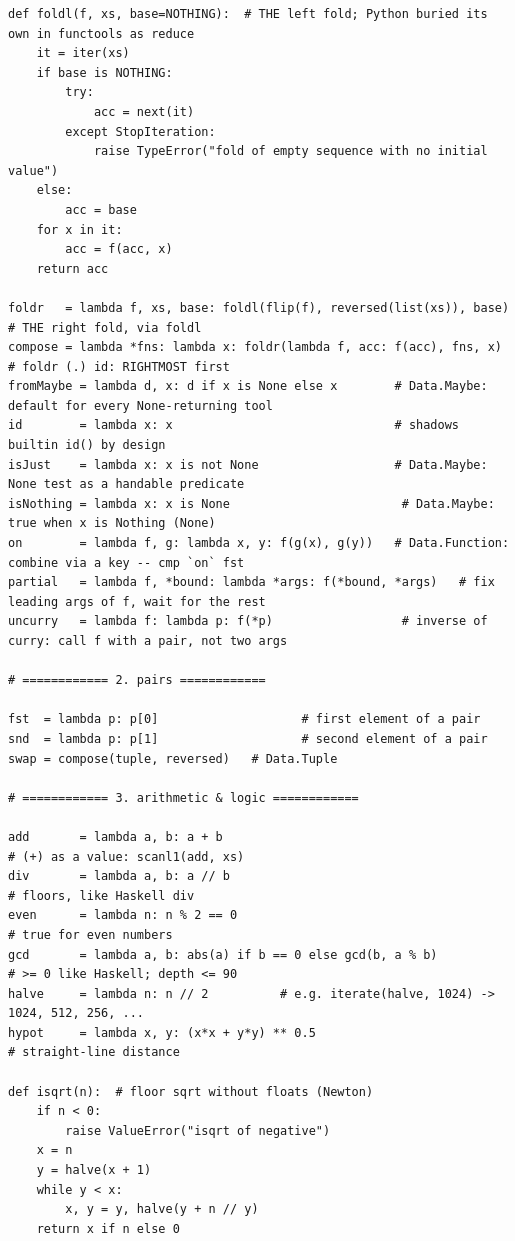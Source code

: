 \documentclass[11pt,letterpaper]{book}
\begin{document}
\begin{lstlisting}[style=file]
def foldl(f, xs, base=NOTHING):  # THE left fold; Python buried its own in functools as reduce
    it = iter(xs)
    if base is NOTHING:
        try:
            acc = next(it)
        except StopIteration:
            raise TypeError("fold of empty sequence with no initial value")
    else:
        acc = base
    for x in it:
        acc = f(acc, x)
    return acc

foldr   = lambda f, xs, base: foldl(flip(f), reversed(list(xs)), base)  # THE right fold, via foldl
compose = lambda *fns: lambda x: foldr(lambda f, acc: f(acc), fns, x)   # foldr (.) id: RIGHTMOST first
fromMaybe = lambda d, x: d if x is None else x        # Data.Maybe: default for every None-returning tool
id        = lambda x: x                               # shadows builtin id() by design
isJust    = lambda x: x is not None                   # Data.Maybe: None test as a handable predicate
isNothing = lambda x: x is None                        # Data.Maybe: true when x is Nothing (None)
on        = lambda f, g: lambda x, y: f(g(x), g(y))   # Data.Function: combine via a key -- cmp `on` fst
partial   = lambda f, *bound: lambda *args: f(*bound, *args)   # fix leading args of f, wait for the rest
uncurry   = lambda f: lambda p: f(*p)                  # inverse of curry: call f with a pair, not two args

# ============ 2. pairs ============

fst  = lambda p: p[0]                    # first element of a pair
snd  = lambda p: p[1]                    # second element of a pair
swap = compose(tuple, reversed)   # Data.Tuple

# ============ 3. arithmetic & logic ============

add       = lambda a, b: a + b                                           # (+) as a value: scanl1(add, xs)
div       = lambda a, b: a // b                                          # floors, like Haskell div
even      = lambda n: n % 2 == 0                                         # true for even numbers
gcd       = lambda a, b: abs(a) if b == 0 else gcd(b, a % b)             # >= 0 like Haskell; depth <= 90
halve     = lambda n: n // 2          # e.g. iterate(halve, 1024) -> 1024, 512, 256, ...
hypot     = lambda x, y: (x*x + y*y) ** 0.5                              # straight-line distance

def isqrt(n):  # floor sqrt without floats (Newton)
    if n < 0:
        raise ValueError("isqrt of negative")
    x = n
    y = halve(x + 1)
    while y < x:
        x, y = y, halve(y + n // y)
    return x if n else 0


\end{lstlisting}
\end{document}
